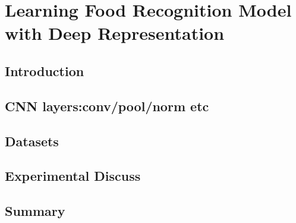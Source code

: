 \chapter{Learning Food Recognition Model with Deep Representation}

\section{Introduction}
%

\section{CNN layers:conv/pool/norm etc}

\section{Datasets}

\section{Experimental Discuss}

\section{Summary}